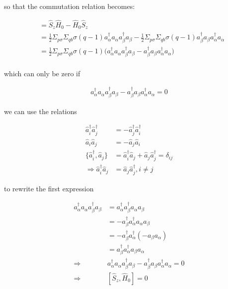 \documentclass[twoside,twocolumn]{article}
\begin{document}
so that the commutation relation becomes:

\begin{align*}
[\hat{S}_z, \hat{H}_0] &= \hat{S}_z \hat{H}_0 - \hat{H}_0  \hat{S}_z \\
&= \frac{1}{2} \Sigma_{p\sigma}  \Sigma_{qb} \sigma (q-1) a_\alpha^\dagger a_\alpha  a_\beta^\dagger a_\beta - \frac{1}{2} \Sigma_{p\sigma}  \Sigma_{qb} \sigma (q-1) a_\beta^\dagger a_\beta a_\alpha^\dagger a_\alpha \\
&= \frac{1}{2} \Sigma_{p\sigma}  \Sigma_{qb} \sigma (q-1) \big( a_\alpha^\dagger a_\alpha  a_\beta^\dagger a_\beta - a_\beta^\dagger a_\beta a_\alpha^\dagger a_\alpha \big) \\
\end{align*}

which can only be zero if

\begin{align*}
a_\alpha^\dagger a_\alpha  a_\beta^\dagger a_\beta - a_\beta^\dagger a_\beta a_\alpha^\dagger a_\alpha = 0
\end{align*}

we can use the relations 

\begin{align*}
\hat{a}_i^\dag \hat{a}_j^\dag &= -\hat{a}_j^\dag \hat{a}_i^\dag \\
\hat{a}_i \hat{a}_j &= -\hat{a}_j \hat{a}_i \\
\lbrace \hat{a}_i^\dag, \hat{a}_j \rbrace &= \hat{a}_i^\dag \hat{a}_j + \hat{a}_j \hat{a}_j^\dag = \delta_{ij} \\
\Rightarrow \hat{a}_i^\dag \hat{a}_j &= \hat{a}_j \hat{a}_j^\dag, i\neq j
\end{align*}

to rewrite the first expression

\begin{align*}
a_\alpha^\dagger a_\alpha  a_\beta^\dagger a_\beta &= a_\alpha^\dagger  a_\beta^\dagger a_\alpha  a_\beta \\
&= -a_\beta^\dagger a_\alpha^\dagger a_\alpha  a_\beta \\
&= -a_\beta^\dagger a_\alpha^\dagger (-a_\beta a_\alpha )  \\
&= a_\beta^\dagger a_\alpha^\dagger a_\beta a_\alpha \\
\Rightarrow &a_\alpha^\dagger a_\alpha  a_\beta^\dagger a_\beta - a_\beta^\dagger a_\beta a_\alpha^\dagger a_\alpha = 0 \\
\Rightarrow  &[\hat{S}_z, \hat{H}_0]  = 0
\end{align*}
\end{document}
